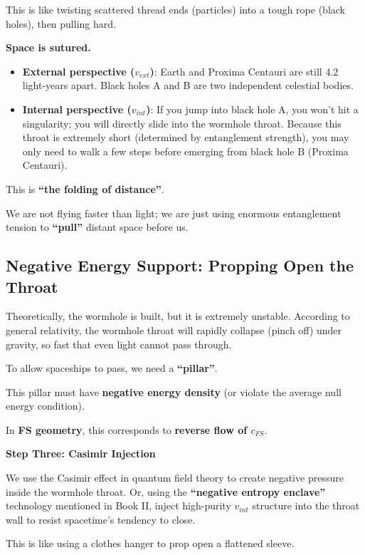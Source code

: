 This is like twisting scattered thread ends (particles) into a tough rope (black holes), then pulling hard.

\textbf{Space is sutured.}

\begin{itemize}
\item \textbf{External perspective ($v_{ext}$)}: Earth and Proxima Centauri are still 4.2 light-years apart. Black holes A and B are two independent celestial bodies.

\item \textbf{Internal perspective ($v_{int}$)}: If you jump into black hole A, you won't hit a singularity; you will directly slide into the wormhole throat. Because this throat is extremely short (determined by entanglement strength), you may only need to walk a few steps before emerging from black hole B (Proxima Centauri).
\end{itemize}

This is \textbf{``the folding of distance''}.

We are not flying faster than light; we are just using enormous entanglement tension to \textbf{``pull''} distant space before us.

\subsection{Negative Energy Support: Propping Open the Throat}

Theoretically, the wormhole is built, but it is extremely unstable. According to general relativity, the wormhole throat will rapidly collapse (pinch off) under gravity, so fast that even light cannot pass through.

To allow spaceships to pass, we need a \textbf{``pillar''}.

This pillar must have \textbf{negative energy density} (or violate the average null energy condition).

In \textbf{FS geometry}, this corresponds to \textbf{reverse flow of $c_{FS}$}.

\textbf{Step Three: Casimir Injection}

We use the Casimir effect in quantum field theory to create negative pressure inside the wormhole throat. Or, using the \textbf{``negative entropy enclave''} technology mentioned in Book II, inject high-purity $v_{int}$ structure into the throat wall to resist spacetime's tendency to close.

This is like using a clothes hanger to prop open a flattened sleeve.

